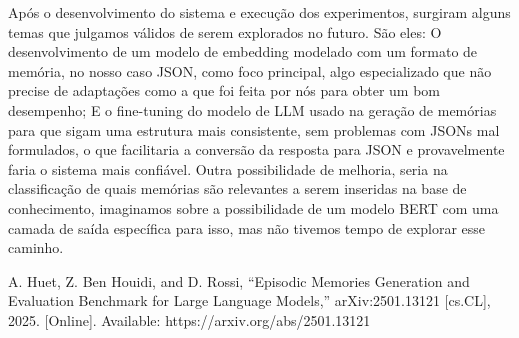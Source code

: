 \documentclass[conference]{IEEEtran}
\begin{document}
Após o desenvolvimento do sistema e execução dos experimentos, surgiram alguns temas que julgamos válidos de serem explorados no futuro. São eles: O desenvolvimento de um modelo de embedding modelado com um formato de memória, no nosso caso JSON, como foco principal, algo especializado que não precise de adaptações como a que foi feita por nós para obter um bom desempenho; E o fine-tuning do modelo de LLM usado na geração de memórias para que sigam uma estrutura mais consistente, sem problemas com JSONs mal formulados, o que facilitaria a conversão da resposta para JSON e provavelmente faria o sistema mais confiável. Outra possibilidade de melhoria, seria na classificação de quais memórias são relevantes a serem inseridas na base de conhecimento, imaginamos sobre a possibilidade de um modelo BERT com uma camada de saída específica para isso, mas não tivemos tempo de explorar esse caminho. 

\begin{thebibliography}{00}
A. Huet, Z. Ben Houidi, and D. Rossi, “Episodic Memories Generation and Evaluation Benchmark for Large Language Models,” arXiv:2501.13121 [cs.CL], 2025. [Online]. Available: https://arxiv.org/abs/2501.13121

\end{thebibliography}
\end{document}
